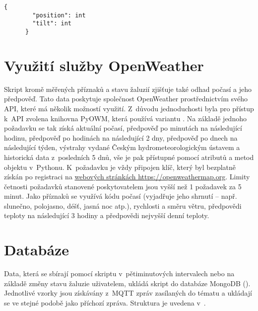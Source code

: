     \begin{lstlisting}[caption={[Struktura zprávy o~stavu žaluzie]Struktura zprávy o~stavu žaluzie, která je všem klientům zasílána každých 15~s. Klíč \code{position} označuje výšku vytažení žaluzie (0 -- zavřeno, 100 -- otevřeno), obdobně hodnota \code{tilt} vyjadřuje naklopení lamel.},captionpos=b,label=lst:wsMsg]
      {
        "position": int
        "tilt": int
      }
    \end{lstlisting}

  \section{Využití služby OpenWeather} \label{sec:owm}
    Skript  kromě měřených příznaků a stavu žaluzií zjišťuje také odhad počasí a jeho předpověď. Tato data poskytuje společnost OpenWeather prostřednictvím svého API, které má několik možností využití. Z~důvodu jednoduchosti byla pro přístup k~API zvolena knihovna PyOWM, která používá variantu . Na základě jednoho požadavku se tak získá aktuální počasí, předpověď po minutách na následující hodinu, předpověď po hodinách na následující 2 dny, předpověď po dnech na následující týden, výstrahy vydané Českým hydrometeorologickým ústavem a historická data z~posledních 5 dnů, vše je pak přístupné pomocí atributů a metod objektu v~Pythonu. K~požadavku je vždy připojen klíč, který byl bezplatně získán po registraci na \href{https://openweathermap.org}{webových stránkách https://openweathermap.org}. Limity četnosti požadavků stanovené poskytovatelem jsou vyšší než 1 požadavek za 5 minut. Jako příznaků se využívá kódu počasí (vyjadřuje jeho shrnutí -- např. slunečno, polojasno, déšť, jasná noc atp.), rychlosti a směru větru, předpovědi teploty na následující 3 hodiny a předpovědi nejvyšší denní teploty.

  \section{Databáze}\label{sec:db}
    Data, která se sbírají pomocí skriptu  v~pětiminutových intervalech nebo na základě změny stavu žaluzie uživatelem, ukládá skript  do databáze MongoDB (\cite{mongodb:mongodb}). Jednotlivé vzorky jsou získávány z~MQTT zpráv zasílaných do tématu  a ukládají se ve stejné podobě jako příchozí zpráva. Struktura je uvedena v~.

